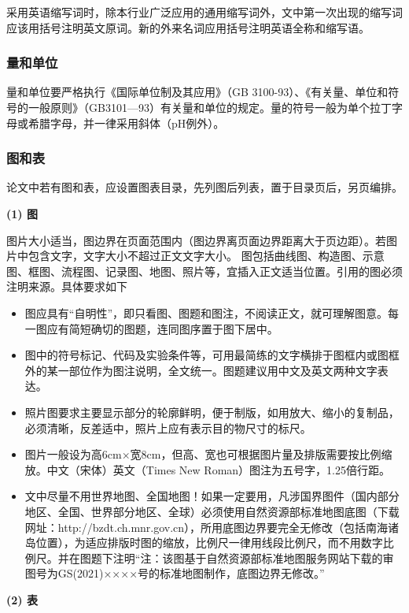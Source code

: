 采用英语缩写词时，除本行业广泛应用的通用缩写词外，文中第一次出现的缩写词应该用括号注明英文原词。新的外来名词应用括号注明英语全称和缩写语。

\subsubsection{量和单位}

量和单位要严格执行《国际单位制及其应用》（GB 3100-93）、《有关量、单位和符号的一般原则》（GB3101—93）有关量和单位的规定。量的符号一般为单个拉丁字母或希腊字母，并一律采用斜体（pH例外）。

\subsubsection{图和表}

论文中若有图和表，应设置图表目录，先列图后列表，置于目录页后，另页编排。

\textbf{(1) 图}

图片大小适当，图边界在页面范围内（图边界离页面边界距离大于页边距）。若图片中包含文字，文字大小不超过正文文字大小。
图包括曲线图、构造图、示意图、框图、流程图、记录图、地图、照片等，宜插入正文适当位置。引用的图必须注明来源。具体要求如下
\begin{itemize}
    \item 图应具有“自明性”，即只看图、图题和图注，不阅读正文，就可理解图意。每一图应有简短确切的图题，连同图序置于图下居中。
    \item 图中的符号标记、代码及实验条件等，可用最简练的文字横排于图框内或图框外的某一部位作为图注说明，全文统一。图题建议用中文及英文两种文字表达。
    \item 照片图要求主要显示部分的轮廓鲜明，便于制版，如用放大、缩小的复制品，必须清晰，反差适中，照片上应有表示目的物尺寸的标尺。
    \item 图片一般设为高6cm×宽8cm，但高、宽也可根据图片量及排版需要按比例缩放。中文（宋体）英文（Times New Roman）图注为五号字，1.25倍行距。
    \item 文中尽量不用世界地图、全国地图！如果一定要用，凡涉国界图件（国内部分地区、全国、世界部分地区、全球）必须使用自然资源部标准地图底图（下载网址：http://bzdt.ch.mnr.gov.cn），所用底图边界要完全无修改（包括南海诸岛位置），为适应排版时图的缩放，比例尺一律用线段比例尺，而不用数字比例尺。并在图题下注明“注：该图基于自然资源部标准地图服务网站下载的审图号为GS(2021)××××号的标准地图制作，底图边界无修改。”
\end{itemize}


\textbf{(2) 表}

